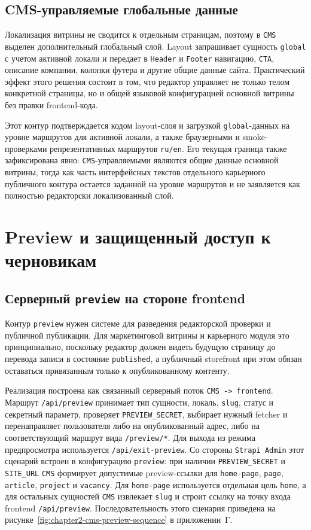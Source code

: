 \subsection{CMS-управляемые глобальные данные}

Локализация витрины не сводится к отдельным страницам, поэтому в \texttt{CMS} выделен
дополнительный глобальный слой. Layout запрашивает сущность \texttt{global} с учетом
активной локали и передает в \texttt{Header} и \texttt{Footer} навигацию, \texttt{CTA},
описание компании, колонки футера и другие общие данные сайта. Практический эффект
этого решения состоит в том, что редактор управляет не только телом конкретной страницы,
но и общей языковой конфигурацией основной витрины без правки frontend-кода.

Этот контур подтверждается кодом layout-слоя и загрузкой \texttt{global}-данных на
уровне маршрутов для активной локали, а также браузерными и smoke-проверками
репрезентативных маршрутов \texttt{ru/en}. Его текущая граница также зафиксирована
явно: \texttt{CMS}-управляемыми являются общие данные основной витрины, тогда как часть
интерфейсных текстов отдельного карьерного публичного контура остается заданной на
уровне маршрутов и не заявляется как полностью редакторски локализованный слой.

\section{Preview и защищенный доступ к черновикам}

\subsection{Серверный \texttt{preview} на стороне frontend}

Контур \texttt{preview} нужен системе для разведения редакторской проверки и публичной
публикации. Для маркетинговой витрины и карьерного модуля это принципиально, поскольку
редактор должен видеть будущую страницу до перевода записи в состояние
\texttt{published}, а публичный storefront при этом обязан оставаться привязанным только
к опубликованному контенту.

Реализация построена как связанный серверный поток \texttt{CMS -> frontend}. Маршрут
\texttt{/api/preview} принимает тип сущности, локаль, \texttt{slug}, статус и секретный
параметр, проверяет \texttt{PREVIEW\_SECRET}, выбирает нужный fetcher и перенаправляет
пользователя либо на опубликованный адрес, либо на соответствующий маршрут вида
\texttt{/preview/*}. Для выхода из режима предпросмотра используется
\texttt{/api/exit-preview}. Со
стороны \texttt{Strapi Admin} этот сценарий встроен в конфигурацию \texttt{preview}:
при наличии \texttt{PREVIEW\_SECRET} и \texttt{SITE\_URL} \texttt{CMS} формирует
допустимые preview-ссылки для \texttt{home-page}, \texttt{page}, \texttt{article},
\texttt{project} и \texttt{vacancy}. Для \texttt{home-page} используется отдельная цель
\texttt{home}, а для остальных сущностей \texttt{CMS} извлекает \texttt{slug} и строит
ссылку на точку входа frontend \texttt{/api/preview}. Последовательность этого сценария
приведена на рисунке~\ref{fig:chapter2-cms-preview-sequence} в приложении~Г.

